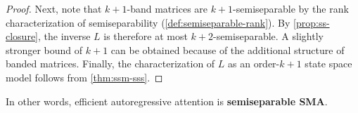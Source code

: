 \begin{proof}
  Next, note that $k+1$-band matrices are $k+1$-semiseparable by the rank characterization of semiseparability (\cref{def:semiseparable-rank}).
  By \cref{prop:ss-closure}, the inverse $L$ is therefore at most $k+2$-semiseparable.
  A slightly stronger bound of $k+1$ can be obtained because of the additional structure of banded matrices.
  Finally, the characterization of $L$ as an order-$k+1$ state space model follows from \cref{thm:ssm-sss}.
\end{proof}


In other words, efficient autoregressive attention is \textbf{semiseparable SMA}.
